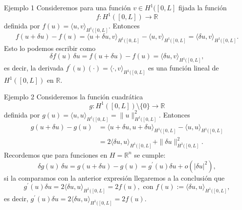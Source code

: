 \documentclass[10pt,handout]{beamer}
\theoremstyle{plain} %
\theoremstyle{plain} %
\theoremstyle{plain} %
\theoremstyle{plain} %
\theoremstyle{definition}
\theoremstyle{example}
\theoremstyle{example}
\theoremstyle{remark}
\theoremstyle{remark}
\begin{document}
\begin{frame}{Ejemplo 1}
Consideremos para una función $v \in H^1([0,L]$ fijada la función 
$$
f:H^1([0,L]) \longrightarrow \mathbb{R}
$$
definida por $f(u)=\langle u, v\rangle_{ H^1([0,L]}.$ Entonces
$$
f(u+\delta u)-f(u) = \langle u+\delta u, v\rangle_{ H^1([0,L]} - \langle u, v\rangle_{ H^1([0,L]} = \langle \delta u, v\rangle_{ H^1([0,L]}.
$$
Esto lo podemos escribir como
$$
\delta f(u) \, \delta u = f(u+\delta u)-f(u) = \langle \delta u, v\rangle_{ H^1([0,L]},
$$
es decir, la derivada $f^{\prime}(u) (\cdot) =\langle \cdot, v \rangle_{H^1([0,L]}$ es una función lineal de $H^1([0,L])$
en $\mathbb{R}.$
\end{frame}

\begin{frame}{Ejemplo 2}
    Consideremos la función cuadrática 
    $$
    g:H^1([0,L])\setminus\{0\} \longrightarrow \mathbb{R}
    $$
    definida por $g(u)=\langle u, u\rangle_{ H^1([0,L]} = \|u\|_{H^1([0,L]}^2.$ Entonces
    \begin{align*}
    g(u+\delta u)-g(u) & = \langle u+\delta u, u+\delta u\rangle_{ H^1([0,L]} - \langle u, u\rangle_{ H^1([0,L]} \\ 
    & =  2 \langle \delta u, u\rangle_{ H^1([0,L]} + \|\delta u\|_{ H^1([0,L]}^2.
    \end{align*}
    Recordemos que para funciones en $H=\mathbb{R}^n$ se cumple:
    $$
    \delta g(u)\, \delta u = g(u+\delta u)-g(u) = g^{\prime}(u)\delta u + o(|\delta u|^2),
    $$
    si la comparamos con la anterior expresión llegaremos a la conclusión que
    $$
    g^{\prime}(u)\delta u = 2 \langle \delta u, u\rangle_{ H^1([0,L]} = 2f(u), \text{ con } f(u):= \langle \delta u, u\rangle_{ H^1([0,L]},
    $$
    es decir, $g^{\prime}(u) \delta u =2 \langle
    \delta u, u \rangle_{H^1([0,L]} = 2f(u).$
    \end{frame}
    
\end{document}
